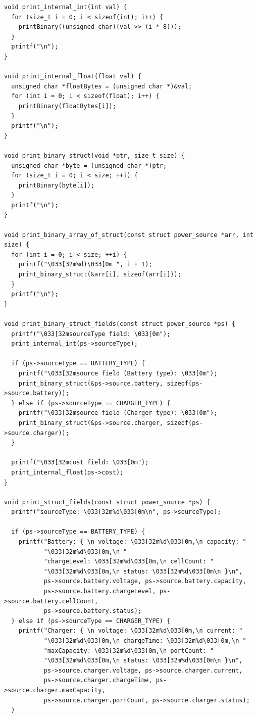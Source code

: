 \begin{lstlisting}[style=customc]
void print_internal_int(int val) {
  for (size_t i = 0; i < sizeof(int); i++) {
    printBinary((unsigned char)(val >> (i * 8)));
  }
  printf("\n");
}

void print_internal_float(float val) {
  unsigned char *floatBytes = (unsigned char *)&val;
  for (int i = 0; i < sizeof(float); i++) {
    printBinary(floatBytes[i]);
  }
  printf("\n");
}

void print_binary_struct(void *ptr, size_t size) {
  unsigned char *byte = (unsigned char *)ptr;
  for (size_t i = 0; i < size; ++i) {
    printBinary(byte[i]);
  }
  printf("\n");
}

void print_binary_array_of_struct(const struct power_source *arr, int size) {
  for (int i = 0; i < size; ++i) {
    printf("\033[32m%d)\033[0m ", i + 1);
    print_binary_struct(&arr[i], sizeof(arr[i]));
  }
  printf("\n");
}

void print_binary_struct_fields(const struct power_source *ps) {
  printf("\033[32msourceType field: \033[0m");
  print_internal_int(ps->sourceType);

  if (ps->sourceType == BATTERY_TYPE) {
    printf("\033[32msource field (Battery type): \033[0m");
    print_binary_struct(&ps->source.battery, sizeof(ps->source.battery));
  } else if (ps->sourceType == CHARGER_TYPE) {
    printf("\033[32msource field (Charger type): \033[0m");
    print_binary_struct(&ps->source.charger, sizeof(ps->source.charger));
  }

  printf("\033[32mcost field: \033[0m");
  print_internal_float(ps->cost);
}

void print_struct_fields(const struct power_source *ps) {
  printf("sourceType: \033[32m%d\033[0m\n", ps->sourceType);

  if (ps->sourceType == BATTERY_TYPE) {
    printf("Battery: { \n voltage: \033[32m%d\033[0m,\n capacity: "
           "\033[32m%d\033[0m,\n "
           "chargeLevel: \033[32m%d\033[0m,\n cellCount: "
           "\033[32m%d\033[0m,\n status: \033[32m%d\033[0m\n }\n",
           ps->source.battery.voltage, ps->source.battery.capacity,
           ps->source.battery.chargeLevel, ps->source.battery.cellCount,
           ps->source.battery.status);
  } else if (ps->sourceType == CHARGER_TYPE) {
    printf("Charger: { \n voltage: \033[32m%d\033[0m,\n current: "
           "\033[32m%d\033[0m,\n chargeTime: \033[32m%d\033[0m,\n "
           "maxCapacity: \033[32m%d\033[0m,\n portCount: "
           "\033[32m%d\033[0m,\n status: \033[32m%d\033[0m\n }\n",
           ps->source.charger.voltage, ps->source.charger.current,
           ps->source.charger.chargeTime, ps->source.charger.maxCapacity,
           ps->source.charger.portCount, ps->source.charger.status);
  }


\end{lstlisting}
